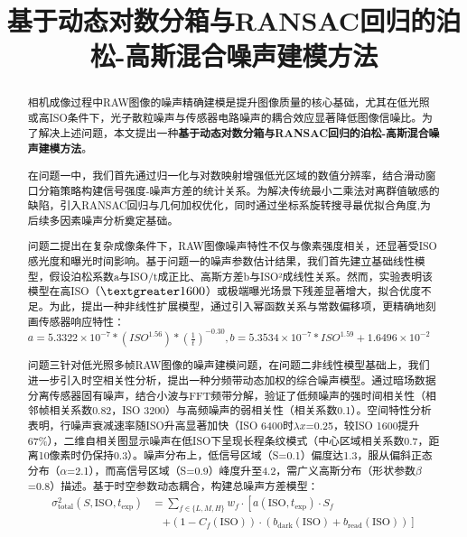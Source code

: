 \documentclass[a4paper]{article}
\title{\textbf{基于动态对数分箱与RANSAC回归的泊松-高斯混合噪声建模方法}}
\date{} %
\begin{document}
	\maketitle
	\vspace{-6em} %
	\begin{abstract}

		相机成像过程中RAW图像的噪声精确建模是提升图像质量的核心基础，尤其在低光照或高ISO条件下，光子散粒噪声与传感器电路噪声的耦合效应显著降低图像信噪比。为了解决上述问题，本文提出一种\textbf{基于动态对数分箱与RANSAC回归的泊松-高斯混合噪声建模方法}。\par
		在问题一中，我们首先通过归一化与对数映射增强低光区域的数值分辨率，结合滑动窗口分箱策略构建信号强度-噪声方差的统计关系。为解决传统最小二乘法对离群值敏感的缺陷，引入RANSAC回归与几何加权优化，同时通过坐标系旋转搜寻最优拟合角度,为后续多因素噪声分析奠定基础。\par
		问题二提出在复杂成像条件下，RAW图像噪声特性不仅与像素强度相关，还显著受ISO感光度和曝光时间影响。基于问题一的噪声参数估计结果，我们首先建立基础线性模型，假设泊松系数a与ISO/t成正比、高斯方差b与ISO²成线性关系。然而，实验表明该模型在高ISO（$\textgreater1600$）或极端曝光场景下残差显著增大，拟合优度不足。为此，提出一种非线性扩展模型，通过引入幂函数关系与常数偏移项，更精确地刻画传感器响应特性：$a=5.3322\times 10^{-7} * (ISO^{1.56}) * (\frac{1}{t})^{-0.30},b=5.3534\times 10^{-7} * ISO^{1.59} + 1.6496\times 10^{-2}$
		\par
		问题三针对低光照多帧RAW图像的噪声建模问题，在问题二非线性模型基础上，我们进一步引入时空相关性分析，提出一种分频带动态加权的综合噪声模型。通过暗场数据分离传感器固有噪声，结合小波与FFT频带分解，验证了低频噪声的强时间相关性（相邻帧相关系数0.82，ISO 3200）与高频噪声的弱相关性（相关系数0.1）。空间特性分析表明，行噪声衰减速率随ISO升高显著加快（ISO 6400时$\lambda x$=0.25，较ISO 1600提升67\%），二维自相关图显示噪声在低ISO下呈现长程条纹模式（中心区域相关系数0.7，距离10像素时仍保持0.3）。噪声分布上，低信号区域（S=0.1）偏度达1.3，服从偏斜正态分布（$\alpha$=2.1），而高信号区域（S=0.9）峰度升至4.2，需广义高斯分布（形状参数$\beta$=0.8）描述。基于时空参数动态耦合，构建总噪声方差模型：
		\begin{align*}
\sigma^2_{\text{total}}(S, \text{ISO}, t_{\text{exp}}) &= \sum_{f\in\{L,M,H\}}w_{f}\cdot\left[a(\text{ISO},t_{\text{exp}})\cdot S_{f}\right. \\
&\quad \left.+(1-C_{f}(\text{ISO}))\cdot(b_{\text{dark}}(\text{ISO})+b_{\text{read}}(\text{ISO}))\right]
\end{align*}
		\newline
	\end{abstract}
\end{document}
